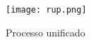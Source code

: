 \begin{figure}[H]
    \caption{\label{rup}Processo unificado}
    \vspace{5pt}
    \centering
    \texttt{[image: rup.png]}
    \vspace{5pt}
\end{figure}



